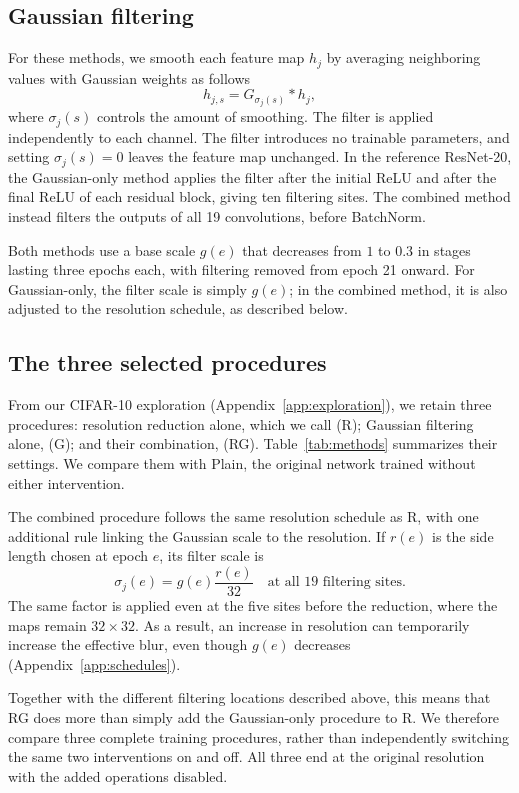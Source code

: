 \subsection{Gaussian filtering}
For these methods, we smooth each feature map $h_j$ by averaging neighboring values with Gaussian weights as follows
\begin{equation}
h_{j,s}=G_{\sigma_j(s)}*h_j,
\label{eq:gaussian}
\end{equation}
where $\sigma_j(s)$ controls the amount of smoothing. The filter is applied independently to each channel. The filter introduces no trainable parameters, and setting $\sigma_j(s)=0$ leaves the feature map unchanged. In the reference ResNet-20, the Gaussian-only method applies the filter after the initial ReLU and after the final ReLU of each residual block, giving ten filtering sites. The combined method instead filters the outputs of all 19 convolutions, before BatchNorm.

Both methods use a base scale $g(e)$ that decreases from $1$ to $0.3$ in stages lasting three epochs each, with filtering removed from epoch 21 onward. For Gaussian-only, the filter scale is simply $g(e)$; in the combined method, it is also adjusted to the resolution schedule, as described below.
\subsection{The three selected procedures}

From our CIFAR-10 exploration (Appendix~\ref{app:exploration}), we retain three procedures: resolution reduction alone, which we call \methodR{} (R); Gaussian filtering alone, \methodG{} (G); and their combination, \methodRG{} (RG). Table~\ref{tab:methods} summarizes their settings. We compare them with Plain, the original network trained without either intervention.



The combined procedure follows the same resolution schedule as R, with one additional rule linking the Gaussian scale to the resolution. If $r(e)$ is the side length chosen at epoch $e$, its filter scale is
\begin{equation}
\sigma_j(e)=g(e)\frac{r(e)}{32}
\quad\text{at all 19 filtering sites}.
\label{eq:coupling}
\end{equation}
The same factor is applied even at the five sites before the reduction, where the maps remain $32\times32$. As a result, an increase in resolution can temporarily increase the effective blur, even though $g(e)$ decreases (Appendix~\ref{app:schedules}).

Together with the different filtering locations described above, this means that RG does more than simply add the Gaussian-only procedure to R. We therefore compare three complete training procedures, rather than independently switching the same two interventions on and off. All three end at the original resolution with the added operations disabled.

